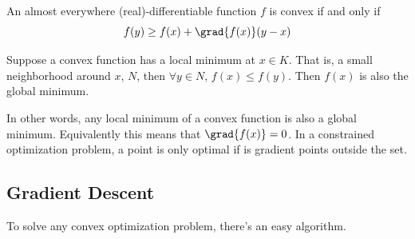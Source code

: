 \begin{theorem}
    An almost everywhere (real)-differentiable function $f$ is convex if and only if
    \[ f(y) \ge f(x) + \grad{f(x)}(y - x) \]
\end{theorem}

\begin{theorem}
    Suppose a convex function has a local minimum at $x \in K$.
    That is, a small neighborhood around $x$, $N$, then $\forall y \in N$, $f(x) \le f(y)$. Then $f(x)$ is also the global minimum.
\end{theorem}
In other words, any local minimum of a convex function is also a global minimum. Equivalently this means that $\grad{f(x)} = 0$.
In a constrained optimization problem, a point is only optimal if is gradient points outside the set. 

\subsection{Gradient Descent}
To solve any 
convex optimization problem, there's an easy algorithm.

